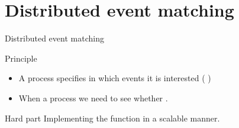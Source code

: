 \section{Distributed event matching}
\begin{slide}{Distributed event matching}
  \begin{centerfig}
  \end{centerfig}
  \begin{block}{Principle}
    \begin{itemize}%
    \item A process specifies in which events it is interested ( )
    \item When a process   we need to see whether  
      .
    \end{itemize}
  \end{block}
  \onslide
  \begin{alertblock}{Hard part}
    Implementing the  function in a scalable manner.
  \end{alertblock}
\end{slide}
